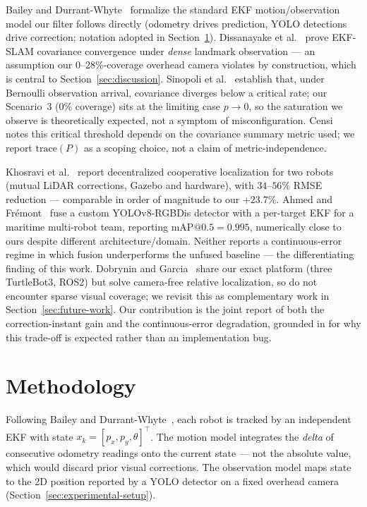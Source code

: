 \documentclass[runningheads]{llncs}
\begin{document}
Bailey and Durrant-Whyte~\cite{bailey2006slam} formalize the standard EKF
motion/observation model our filter follows directly (odometry drives
prediction, YOLO detections drive correction; notation adopted in
Section~\ref{sec:methodology}). Dissanayake et
al.~\cite{dissanayake2001slam} prove EKF-SLAM covariance convergence
under \emph{dense} landmark observation — an assumption our
0--28\%-coverage overhead camera violates by construction, which is
central to Section~\ref{sec:discussion}. Sinopoli et
al.~\cite{sinopoli2004intermittent} establish that, under Bernoulli
observation arrival, covariance diverges below a critical rate; our
Scenario~3 (0\% coverage) sits at the limiting case $p\to0$, so the
saturation we observe is theoretically expected, not a symptom of
misconfiguration. Censi~\cite{censi2009geometric} notes this critical
threshold depends on the covariance summary metric used; we report
$\mathrm{trace}(P)$ as a scoping choice, not a claim of
metric-independence.

Khosravi et al.~\cite{khosravi2026cooperative} report decentralized
cooperative localization for two robots (mutual LiDAR corrections,
Gazebo and hardware), with $34$--$56\%$ RMSE reduction — comparable in
order of magnitude to our $+23.7\%$. Ahmed and
Fr\'emont~\cite{ahmed2026maritime} fuse a custom YOLOv8-RGBDis detector
with a per-target EKF for a maritime multi-robot team, reporting
$\mathrm{mAP@0.5}=0.995$, numerically close to ours despite different
architecture/domain. Neither reports a continuous-error regime in which
fusion underperforms the unfused baseline — the differentiating finding
of this work. Dobrynin and Garcia~\cite{dobrynin2025turtlebot} share our
exact platform (three TurtleBot3, ROS2) but solve camera-free relative
localization, so do not encounter sparse visual coverage; we revisit
this as complementary work in Section~\ref{sec:future-work}. Our
contribution is the joint report of both the correction-instant gain and
the continuous-error degradation, grounded in
\cite{sinopoli2004intermittent,censi2009geometric} for why this
trade-off is expected rather than an implementation bug.

\section{Methodology}
\label{sec:methodology}

Following Bailey and Durrant-Whyte~\cite{bailey2006slam}, each robot is
tracked by an independent EKF with state $x_k=[p_x,p_y,\theta]^\top$.
The motion model integrates the \emph{delta} of consecutive odometry
readings onto the current state — not the absolute value, which would
discard prior visual corrections. The observation model maps state to
the 2D position reported by a YOLO detector on a fixed overhead camera
(Section~\ref{sec:experimental-setup}).
\end{document}

